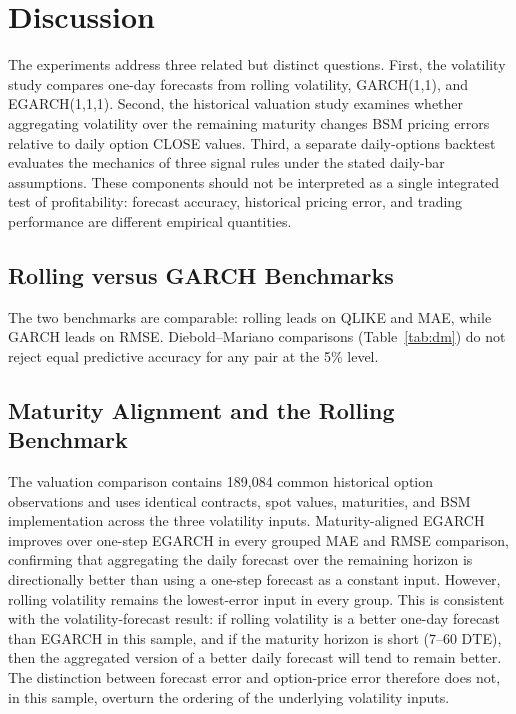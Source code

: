 \documentclass[journal]{IEEEtran}
\begin{document}
\section{Discussion}

The experiments address three related but distinct questions. First, the volatility study compares one-day forecasts from rolling volatility, GARCH(1,1), and EGARCH(1,1,1). Second, the historical valuation study examines whether aggregating volatility over the remaining maturity changes BSM pricing errors relative to daily option CLOSE values. Third, a separate daily-options backtest evaluates the mechanics of three signal rules under the stated daily-bar assumptions. These components should not be interpreted as a single integrated test of profitability: forecast accuracy, historical pricing error, and trading performance are different empirical quantities.

\subsection*{Rolling versus GARCH Benchmarks}

The two benchmarks are comparable: rolling leads on QLIKE and MAE, while GARCH leads on RMSE. Diebold--Mariano comparisons (Table~\ref{tab:dm}) do not reject equal predictive accuracy for any pair at the 5\% level. %

\subsection*{Maturity Alignment and the Rolling Benchmark}

\iffalse %
The valuation comparison contains 189{,}084 common historical option observations and uses identical contracts, spot values, maturities, and BSM implementation across the three volatility inputs. Maturity-aligned EGARCH improves over one-step EGARCH in every grouped MAE and RMSE comparison, confirming that aggregating the daily forecast over the remaining horizon is directionally better than using a one-step forecast as a constant input. However, rolling volatility remains the lowest-error input in every group. This is consistent with the volatility-forecast result: if rolling volatility is a better one-day forecast than EGARCH in this sample, and if the maturity horizon is short (7--60 DTE), then the aggregated version of a better daily forecast will tend to remain better. The distinction between forecast error and option-price error therefore does not, in this sample, overturn the ordering of the underlying volatility inputs.
\end{document}
